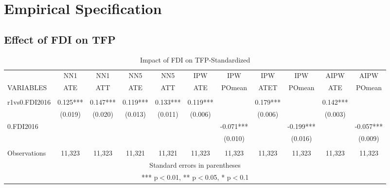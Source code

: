 \documentclass[a4paper,11pt]{scrartcl}
\begin{document}
\section{Empirical Specification}

\subsection{Effect of FDI on TFP}

\begin{table}[htbp]\centering
\caption{Impact of FDI on TFP-Standardized}
\tiny
\begin{tabular}{lcccccccccc} \hline
 & NN1 & NN1 & NN5 & NN5 & IPW & IPW & IPW & IPW & AIPW & AIPW \\
VARIABLES & ATE & ATT & ATE& ATT & ATE & POmean & ATET & POmean & ATE & POmean \\ \hline
 &  &  &  &  &  &  &  &  &  &  \\
r1vs0.FDI2016 & 0.125*** & 0.147*** & 0.119*** & 0.133*** & 0.119*** &  & 0.179*** &  & 0.142*** &  \\
 & (0.019) & (0.020) & (0.013) & (0.011) & (0.006) &  & (0.006) &  & (0.003) &  \\
0.FDI2016 &  &  &  &  &  & -0.071*** &  & -0.199*** &  & -0.057*** \\
 &  &  &  &  &  & (0.010) &  & (0.016) &  & (0.009) \\
 &  &  &  &  &  &  &  &  &  &  \\
 Observations & 11,323 & 11,323 & 11,321 & 11,321 & 11,323 & 11,323 & 11,323 & 11,323 & 11,323 & 11,323 \\ \hline
\multicolumn{11}{c}{ Standard errors in parentheses} \\
\multicolumn{11}{c}{ *** p$<$0.01, ** p$<$0.05, * p$<$0.1} \\
\end{tabular}
\end{table}
\end{document}
